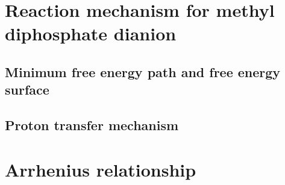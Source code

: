 \section{Reaction mechanism for methyl diphosphate dianion}
\subsection{Minimum free energy path and free energy surface}
\subsection{Proton transfer mechanism}




\section{Arrhenius relationship}




